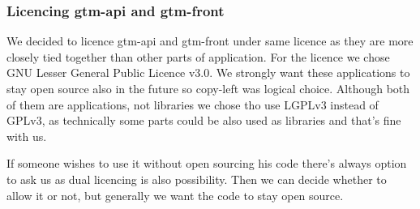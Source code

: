 \subsubsection{Licencing gtm-api and gtm-front}\label{subsubsec:licencing-gtm-api-and-gtm-front}
We decided to licence gtm-api and gtm-front under same licence as they are more closely tied together than other parts of application.
For the licence we chose GNU Lesser General Public Licence v3.0. %
We strongly want these applications to stay open source also in the future so copy-left was logical choice.
Although both of them are applications, not libraries we chose tho use LGPLv3 instead of GPLv3, as technically some parts
could be also used as libraries and that's fine with us.

If someone wishes to use it without open sourcing his code there's always option to ask us as dual licencing is also possibility.
Then we can decide whether to allow it or not, but generally we want the code to stay open source.
